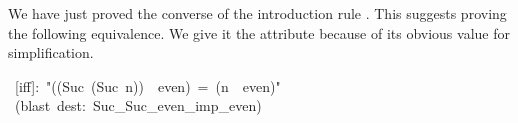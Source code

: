 We have just proved the converse of the introduction rule . 
This suggests proving the following equivalence.  We give it the 
attribute because of its obvious value for simplification.
\begin{isabelle}
\ [iff]:\ "((Suc\ (Suc\ n))\ \isasymin \ even)\ =\ (n\
\isasymin \ even)"\isanewline
{}\ (blast\ dest:\ Suc_Suc_even_imp_even)\isanewline
\isacommand{done}\isanewline
\end{isabelle}
